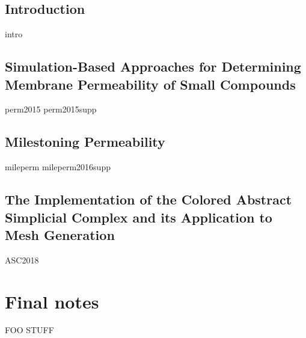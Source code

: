 \documentclass[12pt, chapterheads, final]{ucsd}
\theoremstyle{definition}
\begin{document}
%


\begin{refsection}
\chapter{Introduction}
{intro}
\printbibliography[segment=\therefsegment,heading=subbibintoc]{}
\end{refsection}

\newpage
\begin{refsection}
\chapter{Simulation-Based Approaches for Determining Membrane Permeability of Small Compounds}\label{chap:permeability}
{perm2015}
{perm2015supp}
\printbibliography[segment=\therefsegment,heading=subbibintoc]{}
\end{refsection}

\newpage
\begin{refsection}
\chapter{Milestoning Permeability}\label{chap:mileperm}
{mileperm}
{mileperm2016supp}
\printbibliography[segment=\therefsegment,heading=subbibintoc]{}
\end{refsection}

\newpage
\begin{refsection}
\chapter{The Implementation of the Colored Abstract Simplicial Complex and its Application to Mesh Generation}\label{chap:asc}
{ASC2018}
\printbibliography[segment=\therefsegment,heading=subbibintoc]{}
\end{refsection}

\appendix
\chapter{Final notes}
FOO STUFF

% 
\end{document}
